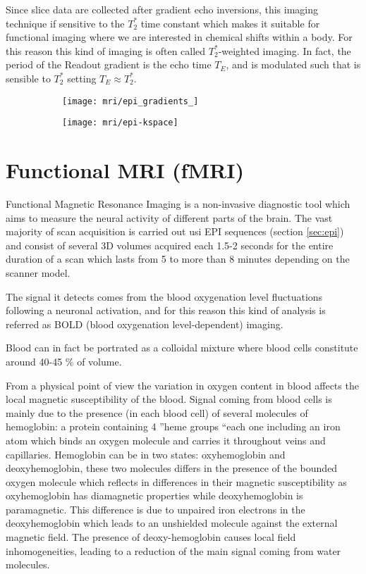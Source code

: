 \documentclass[11pt]{report}
\begin{document}
Since slice data are collected after gradient echo inversions, this imaging technique if sensitive to the $T_2^*$ time constant which makes it suitable for functional imaging where we are interested in chemical shifts within a body. For this reason this kind of imaging is often called $T_2^*$-weighted imaging.
In fact, the period of the Readout gradient is the echo time $T_E$, and is modulated such that is sensible to $T_2^{\ast}$ setting $T_E \approx T_2^{\ast}$.




\begin{figure}
\begin{subfigure}{0.5\textwidth}
\texttt{[image: mri/epi\_gradients\_]}
\caption{}
\label{fig:epi_gradients}
\end{subfigure}
\begin{subfigure}{0.5\textwidth}
\texttt{[image: mri/epi-kspace]}
\caption{}
\label{fig:epi_kspace}
\end{subfigure}
\caption{}
\label{fig:epi}
\end{figure}



\section{Functional MRI (fMRI)}\label{sec:fmri}

Functional Magnetic Resonance Imaging is a non-invasive diagnostic tool which aims to measure the neural activity of different parts of the brain.
The vast majority of scan acquisition is carried out usi EPI sequences (section \ref{sec:epi}) and consist of several 3D volumes acquired each 1.5-2 seconds for the entire duration of a scan which lasts from 5 to more than 8 minutes depending on the scanner model.


The signal it detects comes from the blood oxygenation level fluctuations following a neuronal activation, and for this reason this kind of analysis is referred as BOLD (blood oxygenation level-dependent) imaging.

Blood can in fact be portrated as a colloidal mixture where blood cells constitute around 40-45 \% of volume. \cite{brown-2014}

From a physical point of view the variation in oxygen content in blood affects the local magnetic susceptibility of the blood.
Signal coming from blood cells is mainly due to the presence (in each blood cell) of several molecules of hemoglobin: a protein containing 4 \textquotedblright heme groups \textquotedblleft each one including an iron atom which binds an oxygen molecule and carries it throughout veins and capillaries.
Hemoglobin can be in two states: oxyhemoglobin and deoxyhemoglobin, these two molecules differs in the presence of the bounded oxygen molecule which reflects in differences in their magnetic susceptibility as oxyhemoglobin has diamagnetic properties while deoxyhemoglobin is paramagnetic.
This difference is due to unpaired iron electrons in the deoxyhemoglobin which leads to an unshielded molecule against the external magnetic field.
The presence of deoxy-hemoglobin causes local field inhomogeneities, leading to a reduction of the main signal coming from water molecules.
\end{document}
